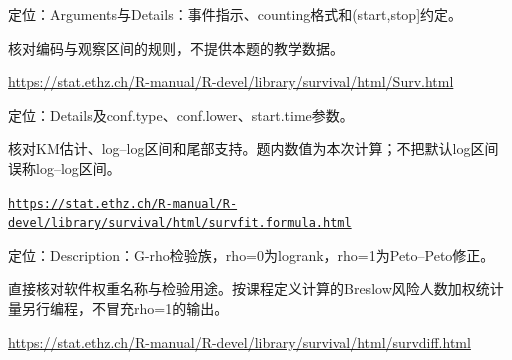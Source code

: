 \par\noindent\begin{minipage}{\linewidth}\raggedright{}\label{src:G4-SURV}
\par
定位：Arguments与Details：事件指示、counting格式和(start,stop]约定。\par
核对编码与观察区间的规则，不提供本题的教学数据。\par
{\small \url{https://stat.ethz.ch/R-manual/R-devel/library/survival/html/Surv.html}}\par
\end{minipage}\par\medskip

\par\noindent\begin{minipage}{\linewidth}\raggedright{}\label{src:G4-SURVFIT}
\par
定位：Details及conf.type、conf.lower、start.time参数。\par
核对KM估计、log–log区间和尾部支持。题内数值为本次计算；不把默认log区间误称log–log区间。\par
{\small \href{https://stat.ethz.ch/R-manual/R-devel/library/survival/html/survfit.formula.html}{\nolinkurl{https://stat.ethz.ch/R-manual/R-devel/library/survival/html/}}\linebreak \href{https://stat.ethz.ch/R-manual/R-devel/library/survival/html/survfit.formula.html}{\nolinkurl{survfit.formula.html}}}\par
\end{minipage}\par\medskip

\par\noindent\begin{minipage}{\linewidth}\raggedright{}\label{src:G4-SURVDIFF}
\par
定位：Description：G-rho检验族，rho=0为logrank，rho=1为Peto–Peto修正。\par
直接核对软件权重名称与检验用途。按课程定义计算的Breslow风险人数加权统计量另行编程，不冒充rho=1的输出。\par
{\small \url{https://stat.ethz.ch/R-manual/R-devel/library/survival/html/survdiff.html}}\par
\end{minipage}\par\medskip

